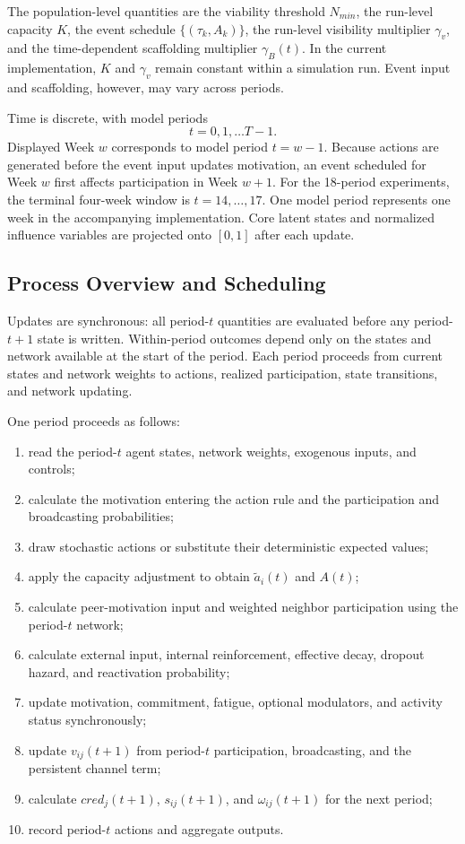 \documentclass[11pt]{article}
\begin{document}
The population-level quantities are the viability threshold $N_{min}$, the run-level capacity $K$, the event schedule $\{(\tau_k,A_k)\}$, the run-level visibility multiplier $\gamma_v$, and the time-dependent scaffolding multiplier $\gamma_B(t)$. In the current implementation, $K$ and $\gamma_v$ remain constant within a simulation run. Event input and scaffolding, however, may vary across periods.

Time is discrete, with model periods
\[
t=0, 1, \ldots T-1.
\]
Displayed Week $w$ corresponds to model period $t=w-1$. Because actions are generated before the event input updates motivation, an event scheduled for Week $w$ first affects participation in Week $w+1$. For the 18-period experiments, the terminal four-week window is $t=14,\dots, 17$. One model period represents one week in the accompanying implementation. Core latent states and normalized influence variables are projected onto $[0,1]$ after each update.

\subsection{Process Overview and Scheduling}
Updates are synchronous: all period-\(t\) quantities are evaluated before any period-\(t+1\) state is written. Within-period outcomes depend only on the states and network available at the start of the period. Each period proceeds from current states and network weights to actions, realized participation, state transitions, and network updating.

One period proceeds as follows:
\begin{enumerate}
    \item read the period-\(t\) agent states, network weights, exogenous inputs, and controls;
    \item calculate the motivation entering the action rule and the participation and broadcasting probabilities;
    \item draw stochastic actions or substitute their deterministic expected
values;
    \item apply the capacity adjustment to obtain \(\tilde a_i(t)\) and \(A(t)\);
    \item calculate peer-motivation input and weighted neighbor participation using the period-\(t\) network;
    \item calculate external input, internal reinforcement, effective decay,   dropout hazard, and reactivation probability;
    \item update motivation, commitment, fatigue, optional modulators, and activity status synchronously;
    \item update \(v_{ij}(t+1)\) from period-\(t\) participation, broadcasting, and the persistent channel term;
    \item calculate \(cred_j(t+1)\), \(s_{ij}(t+1)\), and \(\omega_{ij}(t+1)\) for the next period; 
    \item record period-\(t\) actions and aggregate outputs.
\end{enumerate}
\end{document}

